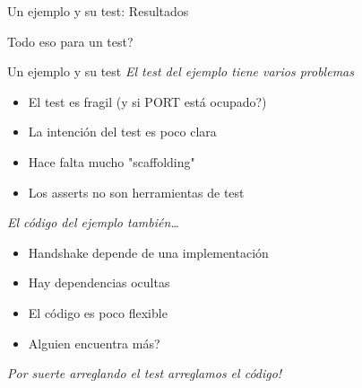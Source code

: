 \begin{frame}{Un ejemplo y su test: Resultados}
\begin{center}
	\textquestiondown Todo eso para un test? \\
	\bigskip
\end{center}
\end{frame}


\begin{frame}{Un ejemplo y su test}
\textit{ El test del ejemplo tiene varios problemas }
\begin{itemize}
	\item El test es fragil (\textquestiondown y si PORT est\'a ocupado?)
	\item La intenci\'on del test es poco clara
	\item Hace falta mucho "scaffolding"
	\item Los asserts no son herramientas de test
\end{itemize}
\textit{ El c\'odigo del ejemplo tambi\'en\ldots}
\begin{itemize}
	\item Handshake depende de una implementaci\'on
	\item Hay dependencias ocultas
	\item El c\'odigo es poco flexible
	\item \textquestiondown Alguien encuentra m\'as?
\end{itemize}
\textit{Por suerte arreglando el test arreglamos el c\'odigo!}
\end{frame}

